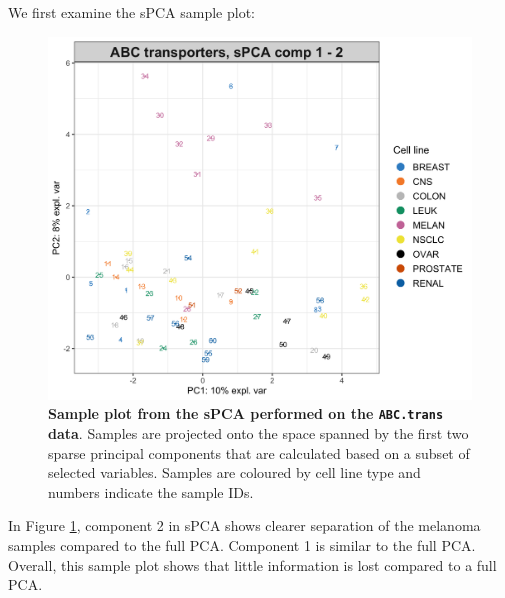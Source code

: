 \documentclass[]{book}
\newenvironment{Shaded}{\begin{snugshade}}{\end{snugshade}}
\newcommand{\KeywordTok}[1]{\textcolor[rgb]{0.13,0.29,0.53}{\textbf{#1}}}
\newcommand{\DataTypeTok}[1]{\textcolor[rgb]{0.13,0.29,0.53}{#1}}
\newcommand{\DecValTok}[1]{\textcolor[rgb]{0.00,0.00,0.81}{#1}}
\newcommand{\StringTok}[1]{\textcolor[rgb]{0.31,0.60,0.02}{#1}}
\newcommand{\CommentTok}[1]{\textcolor[rgb]{0.56,0.35,0.01}{\textit{#1}}}
\newcommand{\OtherTok}[1]{\textcolor[rgb]{0.56,0.35,0.01}{#1}}
\newcommand{\OperatorTok}[1]{\textcolor[rgb]{0.81,0.36,0.00}{\textbf{#1}}}
\newcommand{\NormalTok}[1]{#1}
\begin{document}
We first examine the sPCA sample plot:

\begin{Shaded}
\end{Shaded}

\begin{figure}

{\centering \includegraphics[width=0.5\linewidth]{Figures/PCA/spca-ABCtrans-group-1} 

}

\caption{\textbf{Sample plot from the sPCA performed on
the \texttt{ABC.trans} data}. Samples are projected onto the space
spanned by the first two sparse principal components that are calculated
based on a subset of selected variables. Samples are coloured by cell
line type and numbers indicate the sample IDs.}\label{fig:spca-ABCtrans-group}
\end{figure}







In Figure \ref{fig:spca-ABCtrans-group}, component 2 in sPCA shows
clearer separation of the melanoma samples compared to the full PCA.
Component 1 is similar to the full PCA. Overall, this sample plot shows
that little information is lost compared to a full PCA.
\end{document}
